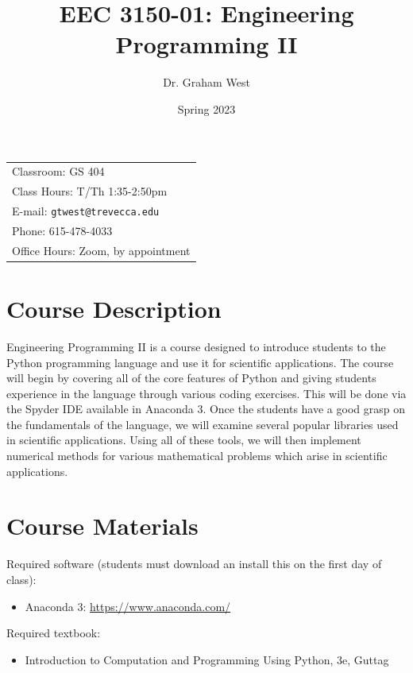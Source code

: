 \documentclass[11pt]{article}
\title{EEC 3150-01: Engineering Programming II }
\author{Dr. Graham West}
\date{Spring 2023}
\newcommand{\blankline}{\quad\pagebreak[2]}
\begin{document}
\maketitle

\blankline

\begin{tabular*}{.93\textwidth}{l}
	Classroom: GS 404 \\
	Class Hours: T/Th 1:35-2:50pm \\
	E-mail: \texttt{gtwest@trevecca.edu} \\
	Phone: 615-478-4033 \\
	Office Hours: Zoom, by appointment \\
\end{tabular*}



\section{Course Description}

Engineering Programming II is a course designed to introduce students to the Python programming language and use it for scientific applications. The course will begin by covering all of the core features of Python and giving students experience in the language through various coding exercises. This will be done via the Spyder IDE available in Anaconda 3. Once the students have a good grasp on the fundamentals of the language, we will examine several popular libraries used in scientific applications. Using all of these tools, we will then implement numerical methods for various mathematical problems which arise in scientific applications.


\section{Course Materials}

Required software (students must download an install this on the first day of class):
\begin{itemize}
	\item Anaconda 3: \href{https://www.anaconda.com/}{https://www.anaconda.com/}
\end{itemize}

Required textbook:
\begin{itemize}
	\item Introduction to Computation and Programming Using Python, 3e, Guttag
\end{itemize}
\end{document}
